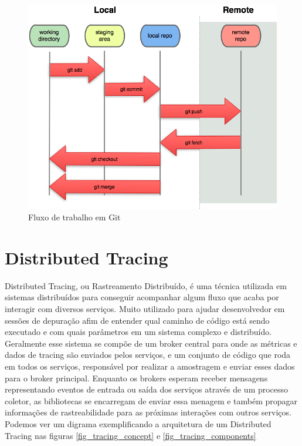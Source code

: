 	\begin{figure}[htb]
		\caption{\label{fig_git2}Fluxo de trabalho em Git}
		\begin{center}
		\includegraphics[scale=1]{pictures/GIT2.png}
		\end{center}
	\end{figure}

	
	\section{Distributed Tracing}
	
	Distributed Tracing, ou Rastreamento Distribuído, é uma técnica utilizada em sistemas distribuídos para conseguir acompanhar algum fluxo que acaba por interagir com diversos serviços. Muito utilizado para ajudar desenvolvedor em sessões de depuração afim de entender qual caminho de código está sendo executado e com quais parâmetros em um sistema complexo e distribuído. Geralmente esse sistema se compõe de um broker central para onde as métricas e dados de tracing são enviados pelos serviços, e um conjunto de código que roda em todos os serviços, responsável por realizar a amostragem e enviar esses dados para o broker principal. Enquanto os brokers esperam receber mensagens representando eventos de entrada ou saída dos serviços através de um processo coletor, as bibliotecas se encarregam de enviar essa menagem e também propagar informações de rastreabilidade para as próximas interações com outros serviços. Podemos ver um digrama exemplificando a arquitetura de um Distributed Tracing nas figuras \ref{fig_tracing_concept} e \ref{fig_tracing_components}
	
